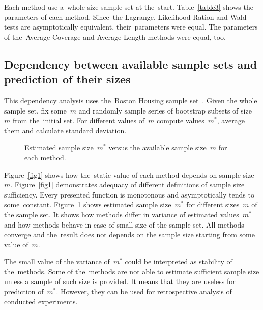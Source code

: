 \documentclass[
11pt,%
tightenlines,%
twoside,%
onecolumn,%
nofloats,%
nobibnotes,%
nofootinbib,%
superscriptaddress,%
noshowpacs,%
centertags]%
{revtex4}
\begin{document}
Each method use a~whole-size sample set at the~start. Table~\ref{table3} shows the parameters of each method. Since~the Lagrange, Likelihood Ration and Wald tests are asymptotically equivalent, their~parameters were equal. The parameters of the~Average Coverage and Average Length methods were equal, too.


\subsection{Dependency between available sample sets and prediction of their sizes}
This dependency analysis uses the~Boston Housing sample set~\cite{boston}. Given the whole sample set, fix some~$m$ and randomly sample series of bootstrap subsets of size~$m$ from the~initial set. For different values of~$m$ compute values~$m^*$, average them and calculate standard deviation. 
 
\begin{figure}[!htp]
 \caption{Estimated sample size~$m^*$ versus the available sample size~$m$ for each method.}
\label{fig2}
\end{figure}

Figure~\ref{fig1} shows how the~static value of each method depends on sample size~$m$. %
Figure~\ref{fig1} demonstrates adequacy of different definitions of sample size sufficiency. Every presented function is monotonous and asymptotically tends to some~constant. Figure~\ref{fig2} shows estimated sample size~$m^*$ for  different sizes~$m$ of the sample set. It shows how methods differ in variance  of estimated values~$m^*$ and how methods behave in case of small size of the sample set. All methods converge and the~result does not depends on the sample size starting from some value of~$m$. 

The small value of the variance of~$m^*$ could be interpreted as stability of the~methods. 
Some of the~methods are not able to estimate sufficient sample size unless a sample of  such size is provided. It means that they are useless for prediction of~$m^*$. However, they can be used for retrospective analysis of conducted experiments.
\end{document}
